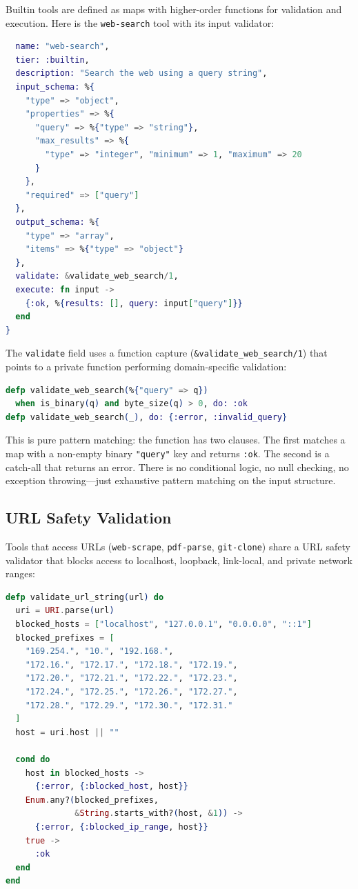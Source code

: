 \documentclass[12pt,a4paper]{article}
\theoremstyle{plain}
\theoremstyle{definition}
\begin{document}
Builtin tools are defined as maps with higher-order functions for validation and execution. Here is the \texttt{web-search} tool with its input validator:

\begin{lstlisting}[language=elixir, caption={Builtin tool definition with validation function.}, label={lst:builtin-tool}]
%{
  name: "web-search",
  tier: :builtin,
  description: "Search the web using a query string",
  input_schema: %{
    "type" => "object",
    "properties" => %{
      "query" => %{"type" => "string"},
      "max_results" => %{
        "type" => "integer", "minimum" => 1, "maximum" => 20
      }
    },
    "required" => ["query"]
  },
  output_schema: %{
    "type" => "array",
    "items" => %{"type" => "object"}
  },
  validate: &validate_web_search/1,
  execute: fn input ->
    {:ok, %{results: [], query: input["query"]}}
  end
}
\end{lstlisting}

The \texttt{validate} field uses a function capture (\texttt{\&validate\_web\_search/1}) that points to a private function performing domain-specific validation:

\begin{lstlisting}[language=elixir, caption={Pattern-matched input validation.}, label={lst:validate}]
defp validate_web_search(%{"query" => q})
  when is_binary(q) and byte_size(q) > 0, do: :ok
defp validate_web_search(_), do: {:error, :invalid_query}
\end{lstlisting}

This is pure pattern matching: the function has two clauses. The first matches a map with a non-empty binary \texttt{"query"} key and returns \texttt{:ok}. The second is a catch-all that returns an error. There is no conditional logic, no null checking, no exception throwing---just exhaustive pattern matching on the input structure.

\subsection{URL Safety Validation}

Tools that access URLs (\texttt{web-scrape}, \texttt{pdf-parse}, \texttt{git-clone}) share a URL safety validator that blocks access to localhost, loopback, link-local, and private network ranges:

\begin{lstlisting}[language=elixir, caption={URL safety validation blocking internal addresses.}, label={lst:url-safety}]
defp validate_url_string(url) do
  uri = URI.parse(url)
  blocked_hosts = ["localhost", "127.0.0.1", "0.0.0.0", "::1"]
  blocked_prefixes = [
    "169.254.", "10.", "192.168.",
    "172.16.", "172.17.", "172.18.", "172.19.",
    "172.20.", "172.21.", "172.22.", "172.23.",
    "172.24.", "172.25.", "172.26.", "172.27.",
    "172.28.", "172.29.", "172.30.", "172.31."
  ]
  host = uri.host || ""

  cond do
    host in blocked_hosts ->
      {:error, {:blocked_host, host}}
    Enum.any?(blocked_prefixes,
              &String.starts_with?(host, &1)) ->
      {:error, {:blocked_ip_range, host}}
    true ->
      :ok
  end
end
\end{lstlisting}
\end{document}
